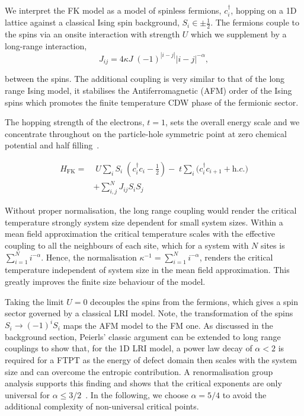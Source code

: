 We interpret the FK model as a model of spinless fermions, \(c^\dagger_{i}\), hopping on a 1D lattice against a classical Ising spin background, \(S_i \in {\pm \frac{1}{2}}\). The fermions couple to the spins via an onsite interaction with strength \(U\) which we supplement by a long-range interaction, \[
J_{ij} = 4\kappa J\; (-1)^{|i-j|} |i-j|^{-\alpha},
\]

between the spins. The additional coupling is very similar to that of the long range Ising model, it stabilises the Antiferromagnetic (AFM) order of the Ising spins which promotes the finite temperature CDW phase of the fermionic sector.

The hopping strength of the electrons, \(t = 1\), sets the overall energy scale and we concentrate throughout on the particle-hole symmetric point at zero chemical potential and half filling~\autocite{gruberFalicovKimballModelReview1996}.

\[\begin{aligned}
H_{\mathrm{FK}} = & \;U \sum_{i} S_i\;(c^\dagger_{i}c_{i} - \tfrac{1}{2}) -\;t \sum_{i} (c^\dagger_{i}c_{i+1} + \textit{h.c.)}\\ 
 &  + \sum_{i, j}^{N} J_{ij}  S_i S_j
\label{eq:HFK}\end{aligned}\]

Without proper normalisation, the long range coupling would render the critical temperature strongly system size dependent for small system sizes. Within a mean field approximation the critical temperature scales with the effective coupling to all the neighbours of each site, which for a system with \(N\) sites is \(\sum_{i=1}^{N} i^{-\alpha}\). Hence, the normalisation \(\kappa^{-1} = \sum_{i=1}^{N} i^{-\alpha}\), renders the critical temperature independent of system size in the mean field approximation. This greatly improves the finite size behaviour of the model.

Taking the limit \(U = 0\) decouples the spins from the fermions, which gives a spin sector governed by a classical LRI model. Note, the transformation of the spins \(S_i \to (-1)^{i} S_i\) maps the AFM model to the FM one. As discussed in the background section, Peierls' classic argument can be extended to long range couplings to show that, for the 1D LRI model, a power law decay of \(\alpha < 2\) is required for a FTPT as the energy of defect domain then scales with the system size and can overcome the entropic contribution. A renormalisation group analysis supports this finding and shows that the critical exponents are only universal for \(\alpha \leq 3/2\)~\autocite{ruelleStatisticalMechanicsOnedimensional1968,thoulessLongRangeOrderOneDimensional1969,angeliniRelationsShortrangeLongrange2014}. In the following, we choose \(\alpha = 5/4\) to avoid the additional complexity of non-universal critical points.
